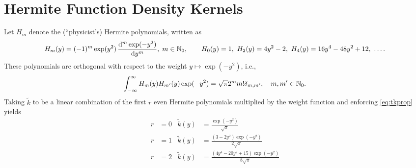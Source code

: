 \documentclass[letterpaper]{amsart}
\newcommand{\tk}{\tilde{k}}
\begin{document}
\section{Hermite Function Density Kernels}

Let $H_m$ denote the (``physicist's) Hermite polynomials, written as
\begin{equation*}
	H_m(y) = (-1)^m \exp(y^2) \, \frac{\dif^m \exp(-y^2)}{\dif y^m}, \; m \in \natzero, \qquad
	H_0(y) = 1, \ H_2(y) = 4y^2-2, \ H_4(y) = 16 y^4 - 48 y^2 + 12, \ \ldots.
\end{equation*}
These polynomials are orthogonal with respect to the weight $y \mapsto \exp(-y^2)$, i.e.,
\begin{equation*}
	\int_{-\infty}^{\infty} H_m(y) H_{m'}(y) \exp(-y^2) = \sqrt{\pi} 2^m m! \delta_{m,m'}, \quad m,m' \in \mathbb{N}_{0}.
\end{equation*}
Taking $\tk$ to be a linear combination of the first $r$ even Hermite polynomials multiplied by the weight function and enforcing \eqref{eq:tkprop} yields
\begin{align*}
	r& = 0  & \tk(y) &= \frac{\exp(-y^2)}{\sqrt{\pi}}
		\\
	r& = 1 &  \tk(y) & =\frac{\left(3 - 2y^{2}\right) \exp(- y^{2})}{2\sqrt{\pi}} \\
	r &= 2 & \tk(y) & = \frac{\left(4 y^{4} - 20 y^{2} + 15\right) \exp(- y^{2})}{8 \sqrt{\pi}}
\end{align*}

















\end{document}
